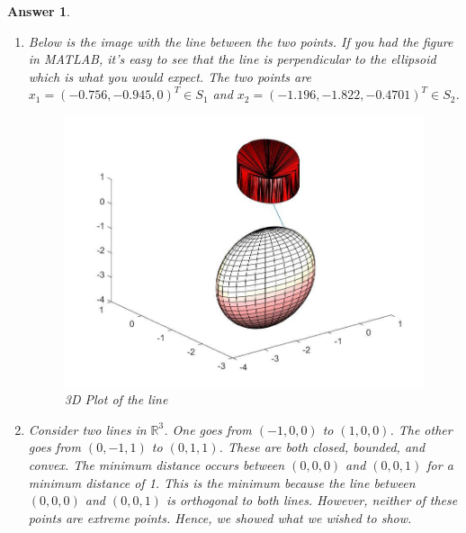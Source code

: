 \documentclass[12pt]{article}
\theoremstyle{colon}
\newtheorem*{answer}{Answer}
\begin{document}
\begin{answer}
\begin{enumerate}[label=\arabic*)]
\begin{lstlisting}[style=Matlab-editor, basicstyle=\scriptsize]
        cvx_end

        figure1 = openfig('distance_computation.fig')
        hold on
        plot3([x_1(1),x_2(1)],[x_1(2),x_2(2)],[x_1(3),x_2(3)])
        saveas(figure1,'question5.jpg')
      \end{lstlisting}

    \item Below is the image with the line between the two points. If you had the figure in MATLAB, it's easy to see that the line is perpendicular to the ellipsoid which is what you would expect. The two points are $x_1 = (-0.756, -0.945, 0)^T \in S_1$ and $x_2 = (-1.196, -1.822, -0.4701)^T \in S_2$.
      \begin{figure}[ht]
        \caption{3D Plot of the line}
        \centering
          \includegraphics[width=\textwidth]{question5.jpg}
      \end{figure}

    \item Consider two lines in $\mathbb{R}^3$. One goes from $(-1,0,0)$ to $(1,0,0)$. The other goes from $(0, -1, 1)$ to $(0,1,1)$. These are both closed, bounded, and convex. The minimum distance occurs between $(0,0,0)$ and $(0,0,1)$ for a minimum distance of 1. This is the minimum because the line between $(0,0,0)$ and $(0,0,1)$ is orthogonal to both lines. However, neither of these points are extreme points. Hence, we showed what we wished to show.
  \end{enumerate}
\end{answer}
\end{document}
